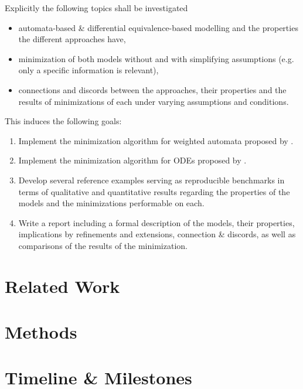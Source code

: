 \documentclass[11pt, rgb]{scrartcl}
\begin{document}
Explicitly the following topics shall be investigated
\begin{itemize}
 \item automata-based \& differential equivalence-based modelling and the properties the different approaches have,
 \item minimization of both models without and with simplifying assumptions (e.g. only a specific information is relevant),
 \item connections and discords between the approaches, their properties and the results of minimizations of each under varying assumptions and conditions.
\end{itemize}
This induces the following goals:
\begin{enumerate}
 \item Implement the minimization algorithm for weighted automata proposed by \autocite{Kiefer2013OnTC}.
 \item Implement the minimization algorithm for ODEs proposed by \autocite{Cardelli2017MaximalAO}.
 \item Develop several reference examples serving as reproducible benchmarks in terms of qualitative and quantitative results regarding the properties of the models and the minimizations performable on each.
 \item Write a report including a formal description of the models, their properties, implications by refinements and extensions, connection \& discords, as well as comparisons of the results of the minimization.
\end{enumerate}


\section{Related Work}

\section{Methods}

\nocite{*}
\printbibliography

\appendix

\section{Timeline \& Milestones}
\end{document}
